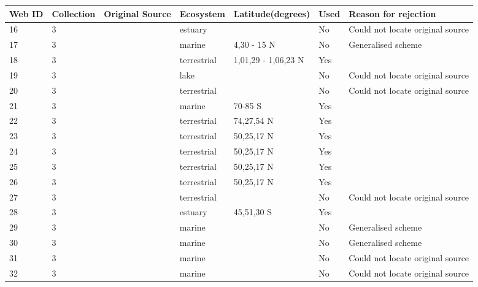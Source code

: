 \documentclass[12pt]{article}
\begin{document}
\begin{landscape}
    \begin{table}[h!]
    \centering
    {\footnotesize
      \begin{tabular}{p{2.8cm}p{1.3cm}p{3cm}p{2.2cm}p{2.5cm}lp{8.2cm}}
        \hline
        Web ID & Collection & Original Source & Ecosystem & Latitude(degrees) & Used  & Reason for rejection  \\
        \hline
        16    & 3 & \cite{Copeland1974}    & estuary &       & No    & Could not locate original source \\
        17    & 3 & \cite{Hiatt1960}  & marine & 4,30 - 15 N & No    & Generalised scheme \\
        18    & 3 & \cite{Niering1963a}  & terrestrial & 1,01,29 - 1,06,23 N & Yes   &     \\
        19    & 3 & \cite{Brooks1963}    & lake &       & No    & Could not locate original source \\
        20    & 3 & \cite{Knox1970}  & terrestrial &       & No    & Could not locate original source \\
        21    & 3 & \cite{Patten1979}  & marine & 70-85 S & Yes   &       \\
        22    & 3 & \cite{Summerhayes1923}  & terrestrial & 74,27,54 N & Yes   & \\
        23    & 3 & \cite{Bird1930}  & terrestrial & 50,25,17 N & Yes  &   \\
        24    & 3 & \cite{Bird1930}  & terrestrial & 50,25,17 N & Yes  & \\
        25    & 3 & \cite{Bird1930}  & terrestrial & 50,25,17 N & Yes   &       \\
        26    & 3 & \cite{Bird1930}  & terrestrial & 50,25,17 N & Yes  & \\
        27    & 3 & \cite{Varley1970}  & terrestrial &       & No    & Could not locate original source \\
        28    & 3 & \cite{Paviour-Smith1956}  & estuary & 45,51,30 S & Yes   &       \\
        29    & 3 & \cite{Dunbar1953}  & marine &       & No    & Generalised scheme \\
        30    & 3 & \cite{Mackintosh1964}  & marine &       & No    & Generalised scheme \\
        31    & 3 & \cite{Petipa1970}  & marine &       & No    & Could not locate original source \\
        32    & 3 & \cite{Petipa1970}  & marine &       & No    & Could not locate original source \\

\end{tabular}}
\end{table}
\end{landscape}
\end{document}
